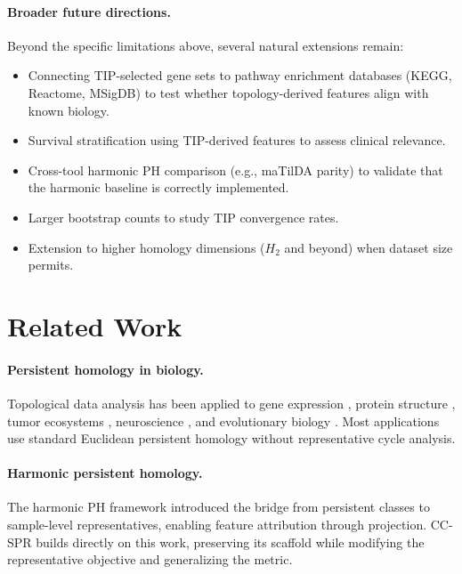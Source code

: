 \documentclass[11pt]{article}
\begin{document}
\paragraph{Broader future directions.}
Beyond the specific limitations above, several natural extensions remain:
\begin{itemize}[leftmargin=1.5em]
\item Connecting TIP-selected gene sets to pathway enrichment databases (KEGG, Reactome, MSigDB) to test whether topology-derived features align with known biology.
\item Survival stratification using TIP-derived features to assess clinical relevance.
\item Cross-tool harmonic PH comparison (e.g., maTilDA parity) to validate that the harmonic baseline is correctly implemented.
\item Larger bootstrap counts to study TIP convergence rates.
\item Extension to higher homology dimensions ($H_2$ and beyond) when dataset size permits.
\end{itemize}

\section{Related Work}
\label{sec:related}

\paragraph{Persistent homology in biology.}
Topological data analysis has been applied to gene expression \cite{rizvi2017}, protein structure \cite{xia2014}, tumor ecosystems \cite{vipond2021}, neuroscience \cite{giusti2015}, and evolutionary biology \cite{chan2013topology}.
Most applications use standard Euclidean persistent homology without representative cycle analysis.

\paragraph{Harmonic persistent homology.}
The harmonic PH framework \cite{harmonicPH} introduced the bridge from persistent classes to sample-level representatives, enabling feature attribution through projection.
CC-SPR builds directly on this work, preserving its scaffold while modifying the representative objective and generalizing the metric.
\end{document}
